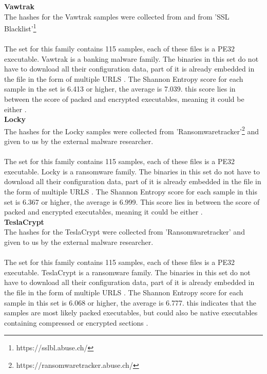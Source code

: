 \documentclass[conference]{IEEEtran}
\begin{document}
\textbf{Vawtrak}\\
The hashes for the Vawtrak samples were collected from \cite{sahin-vawtrak} and from 'SSL Blacklist'\footnote{https://sslbl.abuse.ch/}
\\\\The set for this family contains 115 samples, each of these files is a PE32 executable. Vawtrak is a banking malware family. The binaries in this set do not have to download all their configuration data, part of it is already embedded in the file in the form of  multiple URLS \cite{kroustek-vawtrak}. The Shannon Entropy score for each sample in the set is 6.413 or higher, the average is 7.039. this score lies in between the score of packed and encrypted executables, meaning it could be either \cite{hamrock-entropy}.\\


\textbf{Locky}\\
The hashes for the Locky samples were collected from 'Ransomwaretracker'\footnote{https://ransomwaretracker.abuse.ch/}  and given to us by the external malware researcher.\\\\The set for this family contains 115 samples, each of these files is a PE32 executable. Locky is a ransomware family. The binaries in this set do not have to download all their configuration data, part of it is already embedded in the file in the form of  multiple URLS \cite{nelson-locky}. The Shannon Entropy score for each sample in this set is 6.367 or higher, the average is 6.999. This score lies in between the score of packed and encrypted executables, meaning it could be either \cite{hamrock-entropy}.\\

\textbf{TeslaCrypt}\\
The hashes for the TeslaCrypt were collected from 'Ransomwaretracker' and given to us by the external malware researcher. \\\\The set for this family contains 115 samples, each of these files is a PE32 executable. TeslaCrypt is a ransomware family. The binaries in this set do not have to download all their configuration data, part of it is already embedded in the file in the form of  multiple URLS \cite{wyke-currans}. The Shannon Entropy score for each sample in this set is 6.068 or higher, the average is 6.777. this indicates that the samples are most likely packed executables, but could also be native executables containing compressed or encrypted sections \cite{hamrock-entropy}.
\end{document}
